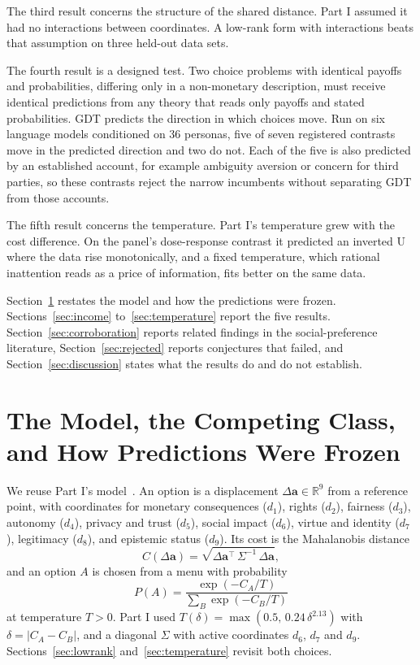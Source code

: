 \documentclass[journal]{IEEEtran}
\begin{document}
The third result concerns the structure of the shared distance.
Part I assumed it had no interactions between coordinates.
A low-rank form with interactions beats that assumption on three held-out data sets.

The fourth result is a designed test.
Two choice problems with identical payoffs and probabilities, differing only in a non-monetary description, must receive identical predictions from any theory that reads only payoffs and stated probabilities.
GDT predicts the direction in which choices move.
Run on six language models conditioned on 36 personas, five of seven registered contrasts move in the predicted direction and two do not.
Each of the five is also predicted by an established account, for example ambiguity aversion or concern for third parties, so these contrasts reject the narrow incumbents without separating GDT from those accounts.

The fifth result concerns the temperature.
Part I's temperature grew with the cost difference.
On the panel's dose-response contrast it predicted an inverted U where the data rise monotonically, and a fixed temperature, which rational inattention reads as a price of information, fits better on the same data.

Section~\ref{sec:recap} restates the model and how the predictions were frozen.
Sections~\ref{sec:income} to~\ref{sec:temperature} report the five results.
Section~\ref{sec:corroboration} reports related findings in the social-preference literature, Section~\ref{sec:rejected} reports conjectures that failed, and Section~\ref{sec:discussion} states what the results do and do not establish.

\section{The Model, the Competing Class, and How Predictions Were Frozen}
\label{sec:recap}

We reuse Part I's model~\cite{bond2026partI}.
An option is a displacement $\Delta\mathbf{a}\in\mathbb{R}^9$ from a reference point, with coordinates for monetary consequences ($d_1$), rights ($d_2$), fairness ($d_3$), autonomy ($d_4$), privacy and trust ($d_5$), social impact ($d_6$), virtue and identity ($d_7$), legitimacy ($d_8$), and epistemic status ($d_9$).
Its cost is the Mahalanobis distance
\begin{equation}
    C(\Delta\mathbf{a}) = \sqrt{\Delta\mathbf{a}^{\top}\, \Sigma^{-1}\, \Delta\mathbf{a}},
    \label{eq:mahalanobis}
\end{equation}
and an option $A$ is chosen from a menu with probability
\begin{equation}
    P(A) = \frac{\exp(-C_A/T)}{\sum_{B}\exp(-C_B/T)}
    \label{eq:softmax}
\end{equation}
at temperature $T>0$.
Part I used $T(\delta)=\max(0.5,\,0.24\,\delta^{2.13})$ with $\delta=|C_A-C_B|$, and a diagonal $\Sigma$ with active coordinates $d_6$, $d_7$ and $d_9$.
Sections~\ref{sec:lowrank} and~\ref{sec:temperature} revisit both choices.
\end{document}
